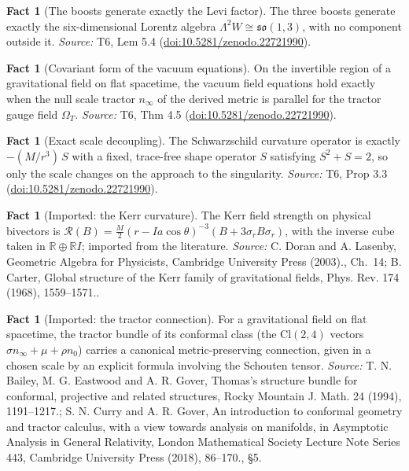 \documentclass[11pt]{article}
\theoremstyle{definition}
\newtheorem{fact}[theorem]{Fact}
\theoremstyle{plain}
\providecommand{\Cl}{}\renewcommand{\Cl}{\mathrm{Cl}}
\providecommand{\R}{}\renewcommand{\R}{\mathbb{R}}
\providecommand{\nInf}{}\renewcommand{\nInf}{n_\infty}
\providecommand{\nO}{}\renewcommand{\nO}{n_0}
\begin{document}
\begin{fact}[The boosts generate exactly the Levi factor]\label{c:interior.boosts-generate-exactly-levi-factor}
The three boosts generate exactly the six-dimensional Lorentz algebra $\Lambda^2 W \cong \mathfrak{so}(1,3)$, with no component outside it.
\emph{Source:} T6, Lem 5.4 (\href{https://doi.org/10.5281/zenodo.22721990}{doi:10.5281/zenodo.22721990}).
\end{fact}

\begin{fact}[Covariant form of the vacuum equations]\label{c:interior.covariant-form-vacuum-equations}
On the invertible region of a gravitational field on flat spacetime, the vacuum field equations hold exactly when the null scale tractor $\nInf$ of the derived metric is parallel for the tractor gauge field $\Omega_{T}$.
\emph{Source:} T6, Thm 4.5 (\href{https://doi.org/10.5281/zenodo.22721990}{doi:10.5281/zenodo.22721990}).
\end{fact}

\begin{fact}[Exact scale decoupling]\label{c:interior.exact-scale-decoupling}
The Schwarzschild curvature operator is exactly $-(M/r^3)\,S$ with a fixed, trace-free shape operator $S$ satisfying $S^2 + S = 2$, so only the scale changes on the approach to the singularity.
\emph{Source:} T6, Prop 3.3 (\href{https://doi.org/10.5281/zenodo.22721990}{doi:10.5281/zenodo.22721990}).
\end{fact}

\begin{fact}[Imported: the Kerr curvature]\label{c:interior.imported-kerr-curvature}
The Kerr field strength on physical bivectors is $\mathcal{R}(B) = \tfrac{M}{2}(r - Ia\cos\theta)^{-3}(B + 3\sigma_r B\sigma_r)$, with the inverse cube taken in $\R \oplus \R I$; imported from the literature.
\emph{Source:} C. Doran and A. Lasenby, Geometric Algebra for Physicists, Cambridge University Press (2003)., Ch.~14; B. Carter, Global structure of the Kerr family of gravitational fields, Phys. Rev. 174 (1968), 1559--1571..
\end{fact}

\begin{fact}[Imported: the tractor connection]\label{c:interior.imported-tractor-connection}
For a gravitational field on flat spacetime, the tractor bundle of its conformal class (the $\Cl(2,4)$ vectors $\sigma\nInf + \mu + \rho\nO$) carries a canonical metric-preserving connection, given in a chosen scale by an explicit formula involving the Schouten tensor.
\emph{Source:} T. N. Bailey, M. G. Eastwood and A. R. Gover, Thomas's structure bundle for conformal, projective and related structures, Rocky Mountain J. Math. 24 (1994), 1191--1217.; S. N. Curry and A. R. Gover, An introduction to conformal geometry and tractor calculus, with a view towards analysis on manifolds, in Asymptotic Analysis in General Relativity, London Mathematical Society Lecture Note Series 443, Cambridge University Press (2018), 86--170., \S 5.
\end{fact}
\end{document}
